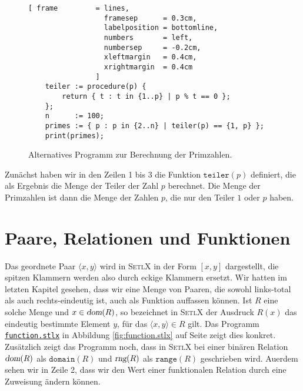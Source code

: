 \begin{figure}[!ht]
  \centering
\begin{Verbatim}[ frame         = lines, 
                  framesep      = 0.3cm, 
                  labelposition = bottomline,
                  numbers       = left,
                  numbersep     = -0.2cm,
                  xleftmargin   = 0.4cm,
                  xrightmargin  = 0.4cm
                ]
    teiler := procedure(p) {
        return { t : t in {1..p} | p % t == 0 };
    };
    n      := 100;
    primes := { p : p in {2..n} | teiler(p) == {1, p} };
    print(primes);
\end{Verbatim} 
\vspace*{-0.3cm}
\caption{Alternatives Programm zur Berechnung der Primzahlen.  \label{fig:primes-slim.stlx}}
\end{figure} %

Zun\"{a}chst haben wir in den Zeilen 1 bis 3 die Funktion $\texttt{teiler}(p)$ definiert, die
als Ergebnis die Menge der Teiler der Zahl $p$ berechnet.  Die Menge der Primzahlen ist dann die
Menge der Zahlen $p$, die nur den Teiler $1$ oder $p$ haben.


\section{Paare, Relationen und Funktionen}
Das geordnete Paar $\langle x, y \rangle$ wird in \textsc{SetlX} in der Form $[x,y]$
dargestellt, die spitzen Klammern werden also durch eckige Klammern ersetzt.
Wir hatten im letzten Kapitel gesehen, dass wir eine Menge von Paaren, die
sowohl links-total als auch rechts-eindeutig ist, auch als Funktion auffassen
k\"{o}nnen.  Ist $R$ eine solche Menge und $x \in \textsl{dom}(R)$, so bezeichnet in
\textsc{SetlX} der Ausdruck $R(x)$  das eindeutig bestimmte Element $y$, f\"{u}r das
$\langle x, y \rangle \in R$ gilt.  Das Programm 
\href{https://github.com/karlstroetmann/Logik/blob/master/SetlX/function.stlx}{\texttt{function.stlx}}
in Abbildung
\ref{fig:function.stlx} auf Seite \pageref{fig:function.stlx} zeigt dies konkret.
Zus\"{a}tzlich zeigt das Programm noch, dass in \textsc{SetlX} bei einer bin\"{a}ren
Relation $\textsl{dom}(R)$ als $\texttt{domain}(R)$ und $\textsl{rng}(R)$ als $\mathtt{range}(R)$ geschrieben wird.
Au\3erdem sehen wir in Zeile 2, dass wir den Wert einer funktionalen Relation durch eine
Zuweisung \"{a}ndern k\"{o}nnen.

